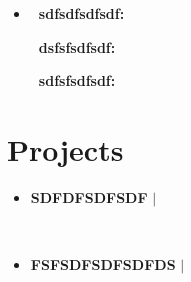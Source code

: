 \documentclass[letterpaper,5pt]{article}
\begin{document}
        \begin{itemize}[leftmargin=0.15in,label={}]
        \item{
          
            \textbf{\ sdfsdfsdfsdf: } 
            \newline
            \vspace*{-6mm}  
          
            \textbf{\ dsfsfsdfsdf: } 
            \newline
            \vspace*{-6mm}  
          
            \textbf{\ sdfsfsdfsdf: } 
            \newline
            \vspace*{-6mm}  
          
        }

        \end{itemize}

        
    
    \section{Projects}
    
        \begin{itemize}[leftmargin=0.15in,label={}]
        
          \item{
            \textbf{SDFDFSDFSDF} $|$  
            \hfill 
          }
            \begin{itemize}
            \vspace{-5pt}
             
            \vspace{-5pt}
                 
            \   
            \end{itemize}
          
          \item{
            \textbf{FSFSDFSDFSDFDS} $|$  
            \hfill 
          }
            \begin{itemize}
            \vspace{-5pt}
             
            \vspace{-5pt}
                 
            \   
            \end{itemize}
          
          
      \end{itemize}
      \vspace*{-6mm}  
        
\end{document}

